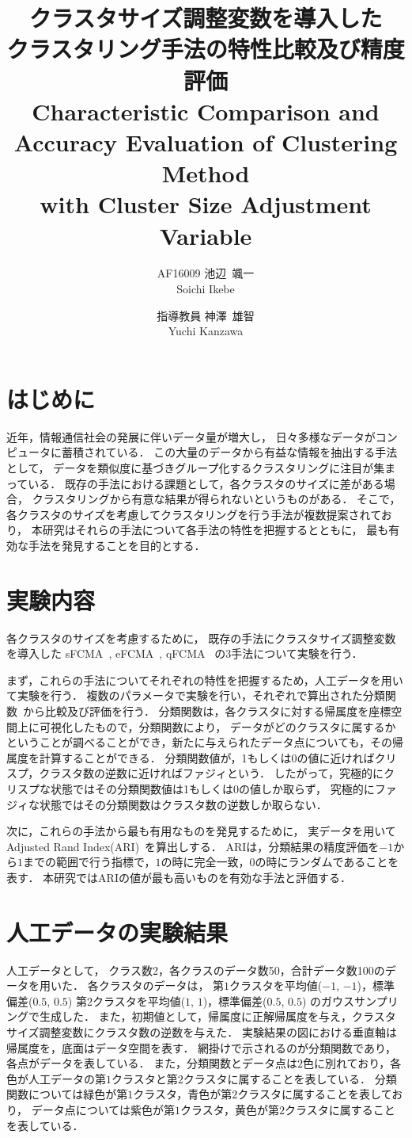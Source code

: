 \documentclass[twocolumn, a4paper]{icethesisabst}
\title{{\bf クラスタサイズ調整変数を導入した \\ クラスタリング手法の特性比較及び精度評価}
  {\normalsize \\ Characteristic Comparison and Accuracy Evaluation of Clustering Method \\ with Cluster Size Adjustment Variable}}
\author{
    AF16009 池辺~颯一 \\ Soichi Ikebe \and
    指導教員 神澤~雄智 \\ Yuchi Kanzawa
  }
\begin{document}
\maketitle


\section{はじめに}
近年，情報通信社会の発展に伴いデータ量が増大し，
日々多様なデータがコンピュータに蓄積されている．
この大量のデータから有益な情報を抽出する手法として，
データを類似度に基づきグループ化するクラスタリングに注目が集まっている．
既存の手法における課題として，各クラスタのサイズに差がある場合，
クラスタリングから有意な結果が得られないというものがある．
そこで，各クラスタのサイズを考慮してクラスタリングを行う手法が複数提案されており，
本研究はそれらの手法について各手法の特性を把握するとともに，
最も有効な手法を発見することを目的とする．


\section{実験内容}
各クラスタのサイズを考慮するために，
既存の手法にクラスタサイズ調整変数を導入した
sFCMA~\cite{sFCMA}, eFCMA~\cite{eFCMA}, qFCMA~\cite{qFCMA}
の3手法について実験を行う．

まず，これらの手法についてそれぞれの特性を把握するため，人工データを用いて実験を行う．
複数のパラメータで実験を行い，それぞれで算出された分類関数~\cite{cFunc}から比較及び評価を行う．
分類関数は，各クラスタに対する帰属度を座標空間上に可視化したもので，分類関数により，
データがどのクラスタに属するかということが調べることができ，新たに与えられたデータ点についても，その帰属度を計算することができる．
分類関数値が，1もしくは0の値に近ければクリスプ，クラスタ数の逆数に近ければファジィという．
したがって，究極的にクリスプな状態ではその分類関数値は1もしくは0の値しか取らず，
究極的にファジィな状態ではその分類関数はクラスタ数の逆数しか取らない．

次に，これらの手法から最も有用なものを発見するために，
実データを用いてAdjusted Rand Index(ARI)~\cite{ARI}を算出しする．
ARIは，分類結果の精度評価を$-1$から$1$までの範囲で行う指標で，$1$の時に完全一致，$0$の時にランダムであることを表す．
本研究ではARIの値が最も高いものを有効な手法と評価する．


\section{人工データの実験結果}
人工データとして，
クラス数2，各クラスのデータ数50，合計データ数100のデータを用いた．
各クラスタのデータは，
第$1$クラスタを平均値($-1$, $-1$)，標準偏差($0.5$, $0.5$)
第$2$クラスタを平均値($1$, $1$)，標準偏差($0.5$, $0.5$)
のガウスサンプリングで生成した．
また，初期値として，帰属度に正解帰属度を与え，クラスタサイズ調整変数にクラスタ数の逆数を与えた．
実験結果の図における垂直軸は帰属度を，底面はデータ空間を表す．
網掛けで示されるのが分類関数であり，各点がデータを表している．
また，分類関数とデータ点は$2$色に別れており，各色が人工データの第$1$クラスタと第$2$クラスタに属することを表している．
分類関数については緑色が第$1$クラスタ，青色が第$2$クラスタに属することを表しており，
データ点については紫色が第$1$クラスタ，黄色が第$2$クラスタに属することを表している．
\end{document}
